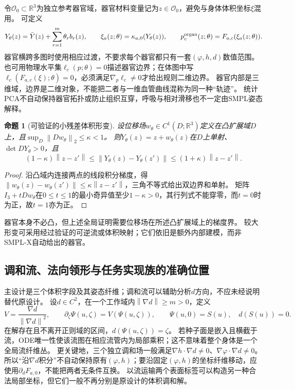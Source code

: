 \documentclass[11pt,a4paper]{article}
\numberwithin{equation}{section}
\newtheorem{proposition}[theorem]{命题}
\theoremstyle{definition}
\newcommand{\R}{\mathbb R}
\newcommand{\norm}[1]{\left\lVert#1\right\rVert}
\begin{document}
令$\mathcal O_0\subset\R^3$为独立参考器官域，器官材料变量记为$z\in\mathcal O_0$，避免与身体体积坐标$\xi$混用。
可定义
\begin{equation}
 Y_\theta(z)=\bar Y(z)+\sum_{r=1}^{m}\theta_r b_r(z),\qquad
 \xi_a(z;\theta)=\kappa_{a,0}(Y_\theta(z)),\qquad
 p_c^{\rm organ}(z;\theta)=F_{a,c}(\xi_a(z;\theta)).
 \label{geo:eq:organ-model}
\end{equation}
器官横跨多图时使用相应过渡，不要求每个器官都只有一套$(\varphi,h,d)$数值范围。
也可用物理水平集$\ell_c(p;\theta)=0$描述器官边界；在体图中写$\ell_c(F_{a,c}(\xi);\theta)=0$，必须满足$\nabla_p\ell_c\ne0$才给出规则二维边界。
器官内部是三维域，边界是二维对象，不能把二者与一维血管曲线混称为同一种“轨迹”。
统计PCA不自动保持器官拓扑或防止组织互穿，呼吸与相对滑移也不一定由SMPL姿态解释。

\begin{proposition}[可验证的小残差体积形变]
\label{geo:prop:organ-injectivity}
设位移场$w_\theta\in C^1(D;\R^3)$定义在凸扩展域$D$上，且$\sup_D\norm{Dw_\theta}_2\le\kappa<1$。
则$Y_\theta(z)=z+w_\theta(z)$在$D$上单射、$\det DY_\theta>0$，且
\begin{equation}
 (1-\kappa)\norm{z-z'}\le
 \norm{Y_\theta(z)-Y_\theta(z')}\le(1+\kappa)\norm{z-z'}.
 \label{geo:eq:organ-bilip}
\end{equation}
\end{proposition}
\begin{proof}
沿凸域内连接两点的线段积分梯度，得$\norm{w_\theta(z)-w_\theta(z')}\le\kappa\norm{z-z'}$，三角不等式给出双边界和单射。
矩阵$I_3+tDw_\theta$在$0\le t\le1$的最小奇异值至少$1-\kappa>0$，其行列式不能穿零，而$t=0$时为正，故$t=1$亦为正。
\end{proof}
器官本身不必凸，但上述全局证明需要位移场在所述凸扩展域上的梯度界。
较大形变可采用经过验证的可逆流或体积映射；它们依旧是额外内部建模，而非SMPL-X自动给出的器官。

\subsection{调和流、法向领形与任务实现族的准确位置}
\label{geo:sub:auxiliary-fibers}

主设计是三个体积字段及其姿态纤维；调和流可以辅助分析$d$方向，不应未经说明替代原设计。
设$d\in C^2$，在一个工作域内$\norm{\nabla d}\ge m>0$，定义
\begin{equation}
 V=\frac{\nabla d}{\norm{\nabla d}^2},\qquad
 \partial_\zeta\Psi(u,\zeta)=V(\Psi(u,\zeta)),\qquad
 \Psi(u,0)=S(u),\quad d(S(u))=0.
 \label{geo:eq:depth-flow}
\end{equation}
在解存在且不离开正则域的区间，$d(\Psi(u,\zeta))=\zeta$。
若种子面是嵌入且横截于流，ODE唯一性使该流图在相应流管内为局部乘积；这不意味着整个身体是一个全局流纤维丛。
更关键地，三个独立调和场一般满足$\nabla h\cdot\nabla d\ne0$、$\nabla\varphi\cdot\nabla d\ne0$。
所以“沿$\nabla d$积分”不自动保持原有$(\varphi,h)$；要沿固定$(\varphi,h)$的坐标纤维移动，应使用$\partial_dF_{a,0}$，不能把两者无条件互换。
以流运输两个表面标签可以构造另一种合法局部坐标，但它们一般不再分别是原设计的体积调和解。
\end{document}
